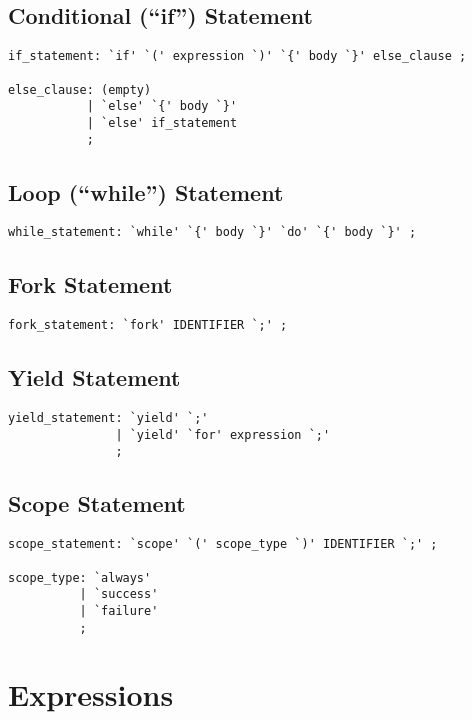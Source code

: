 \documentclass{article}
\begin{document}
\subsection{Conditional (``if'') Statement}

\begin{lstlisting}
if_statement: `if' `(' expression `)' `{' body `}' else_clause ;

else_clause: (empty)
           | `else' `{' body `}'
           | `else' if_statement
           ;
\end{lstlisting}

\subsection{Loop (``while'') Statement}

\begin{lstlisting}
while_statement: `while' `{' body `}' `do' `{' body `}' ;
\end{lstlisting}

\subsection{Fork Statement}

\begin{lstlisting}
fork_statement: `fork' IDENTIFIER `;' ;
\end{lstlisting}

\subsection{Yield Statement}

\begin{lstlisting}
yield_statement: `yield' `;'
               | `yield' `for' expression `;'
               ;
\end{lstlisting}

\subsection{Scope Statement}

\begin{lstlisting}
scope_statement: `scope' `(' scope_type `)' IDENTIFIER `;' ;

scope_type: `always'
          | `success'
          | `failure'
          ;
\end{lstlisting}

\section{Expressions}
\end{document}
